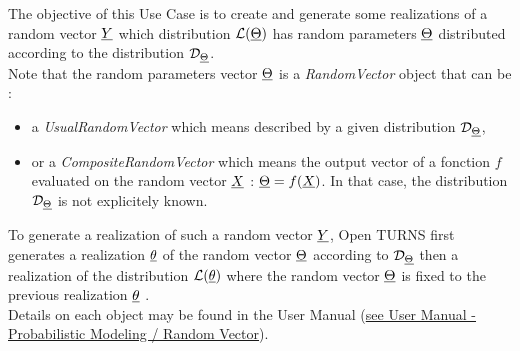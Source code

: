 \renewcommand{\filename}{docUC_InputBayesian.tex}
\renewcommand{\filetitle}{UC : Creation of a random vector with random parameters}

\HeaderIIILevel




The objective of this Use Case is to create and generate some realizations of a random vector ${\underline{Y}}$ which distribution $\mathcal{L}({\underline{\Theta}})$ has random parameters ${\underline{\Theta}}$ distributed according to the distribution $\mathcal{D}_{{\underline{\Theta}}}$.\\

Note that the random parameters vector ${\underline{\Theta}}$ is a {\itshape RandomVector} object that can be :  
\begin{itemize}
  \item a {\itshape UsualRandomVector} which means described by a given distribution $\mathcal{D}_{{\underline{\Theta}}}$,  
  \item or a {\itshape CompositeRandomVector} which means the output vector of a fonction $f$ evaluated on the random vector ${\underline{X}}$  : ${\underline{\Theta}} = f({\underline{X}})$. In that case, the distribution $\mathcal{D}_{{\underline{\Theta}}}$ is not explicitely known.
\end{itemize}

To generate a realization of such a random vector ${\underline{Y}}$, Open TURNS first generates a realization ${\underline{\theta}}$  of the random vector  ${\underline{\Theta}}$ according to  $\mathcal{D}_{{\underline{\Theta}}}$ then a realization of the distribution $\mathcal{L}({\underline{\theta}})$ where the random vector ${\underline{\Theta}}$  is fixed to the previous realization ${\underline{\theta}}$ .\\

Details on each object may be found in the User Manual  (\href{OpenTURNS_UserManual_TUI.pdf}{see User Manual - Probabilistic Modeling / Random Vector}).\\




